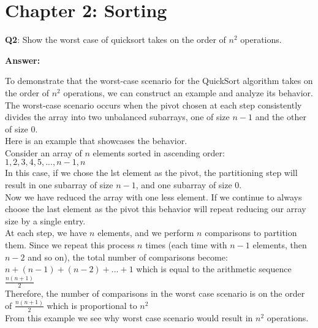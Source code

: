 \documentclass[8pt]{article}
\begin{document}
\newpage
\section*{Chapter 2: Sorting}

\textbf{Q2}: Show the worst case of quicksort takes on the order of \(n^2\) operations.

\textbf{Answer:}

To demonstrate that the worst-case scenario for the QuickSort algorithm takes on the order of \(n^2\) operations, we can construct an example and analyze its behavior. The worst-case scenario occurs when the pivot chosen at each step consistently divides the array into two unbalanced subarrays, one of size 
\(n-1\) and the other of size 0.\\

Here is an example that showcases the behavior. \\ 

Consider an array of $n$ elements sorted in ascending order: \\ 

\(1,2,3,4,5,...,n-1,n\) \\

In this case, if we chose the lst element as the pivot, the partitioning step will result in one subarray of size \(n-1\), and one subarray of size 0. \\

Now we have reduced the array with one less element. If we continue to always choose the last element as the pivot this behavior will repeat reducing our array size by a single entry. \\

At each step, we have $n$ elements, and we perform $n$ comparisons to partition them. Since we repeat this process $n$ times (each time with \(n-1\) elements, then \(n-2\) and so on), the total number of comparisons become: \\ 

\(n + (n-1) + (n-2) + ... + 1 \) which is equal to the arithmetic sequence \(\frac{n(n+1)}{2}\) \\

Therefore, the number of comparisons in the worst case scenario is on the order of \(\frac{n(n+1)}{2}\) which is proportional to $n^2$ \\

From this example we see why worst case scenario would result in $n^2$ operations. \\
\end{document}
